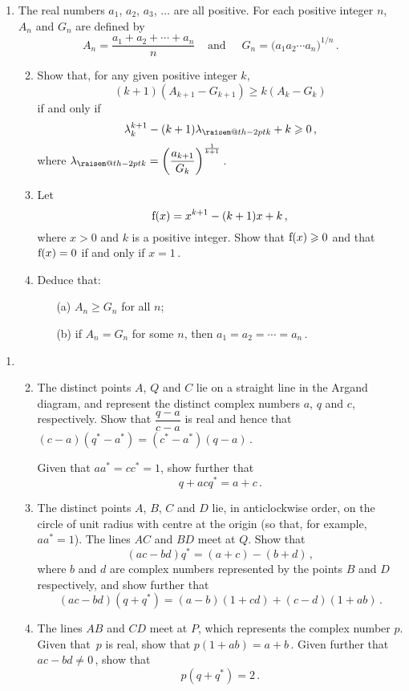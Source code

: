 \documentclass[a4, 11pt]{report}
\makeatletter
\newlength{\qspace}
\newcounter{qnumber}
\newenvironment{question}%
 {\vspace{\qspace}
  \begin{enumerate}[\bfseries 1\quad][10]%
    \setcounter{enumi}{\value{qnumber}}%
    \item%
 }
{
  \end{enumerate}
  \filbreak
  \stepcounter{qnumber}
 }
\newenvironment{questionparts}[1][1]%
 {
  \begin{enumerate}[\bfseries (i)]%
    \setcounter{enumii}{#1}
    \addtocounter{enumii}{-1}
    \setlength{\itemsep}{3mm}
    \setlength{\parskip}{8pt}
 }
 {
  \end{enumerate}
 }
\def\f{{\rm f}}
\newcommand{\raisemath}[1]{\mathpalette{\raisem@th{#1}}}
\newcommand{\raisem@th}[3]{\raisebox{#1}{$#2#3$}}
\def\ge{\geqslant}
\makeatother
\begin{document}
\begin{question}
The real numbers $a_1$, $a_2$, $a_3$, $\ldots$ are all positive. For each positive
integer $n$, $A_n$ and $G_n$ are defined by 
\[
A_n = \frac{a_1+a_2 + \cdots + a_n}n 
\ \ \ \ \ \text{and } \ \ \ \ \ 
G_n = \big( a_1a_2\cdots a_n\big) ^{1/n}
\,.
\]
\begin{questionparts}
\item Show that, for any given positive integer $k$, 
\[
(k+1) ( A_{k+1} - G_{k+1}) \ge  k (A_k-G_k)
\]
if and only if 
\[\lambda^{k+1}_k -(k+1)\lambda_{\raisemath{-2  pt}{k}} +k \ge 0\,,
\]
 where
$ \lambda_{\raisemath{-2pt}{k}} = \left(\dfrac{a_{k+1}}{G_{k}}\right)^{\frac1 {k+1}}\,$. 

\item
Let 
\[
 \f(x)=x^{k+1} -(k+1)x +k \,,
\]
 where
$x>0$ and $k$ is a positive integer. Show that $\f(x)\ge0$
and that $\f(x)=0$  
if and only if
 $x = 1\,$. 

\item
Deduce  that:
\begin{enumerate}
\item[(a)]
 $A_n \ge G_n$ for all $n$; 
\\
\item[(b)]
if $A_n=G_n$ for some $n$, then $a_1=a_2 = \cdots = a_n\,$.
\end{enumerate}
\end{questionparts}
\end{question}








\begin{question}
\begin{questionparts}
\item
The 
distinct
points $A$, $Q$ and $C$ lie on a straight line in the Argand diagram,
and 
represent the distinct
complex numbers $a$, $q$ and $c$, respectively. 
Show that
$\dfrac {q-a}{c-a}$
 is real and hence that 
$(c-a)(q^*-a^*) = (c^*-a^*)(q-a)\,$.

Given that $aa^* = cc^* = 1$, show further that 
\[
q+ ac q^* = a+c
\,.
\]

\item
The distinct points $A$, $B$, $C$ and $D$ lie, in anticlockwise order,
 on the circle of unit radius 
with centre at the origin  
(so that, for example, $aa^* =1$).
The lines $AC$ and $BD$ meet at $Q$.
Show that 
\[
(ac-bd)q^* = (a+c)-(b+d)
\,,
\]
where  
$b$ and $d$  are complex numbers represented by the 
points $B$ and $D$
  respectively,
and show further that
\[
(ac-bd)
 (q+q^*) = 
(a-b)(1+cd) +(c-d)(1+ab)
\,.
\]

\item
The lines $AB$ and $CD$
meet at $P$, which  represents the complex number
$p$. Given that~$p$ is real, show that $p(1+ab)=a+b\,$.
Given further that $ac-bd \ne 0\,$,
show that 
\[
p(q+q^*) =  2 
\,.
\]

\end{questionparts}
\end{question}
\end{document}
